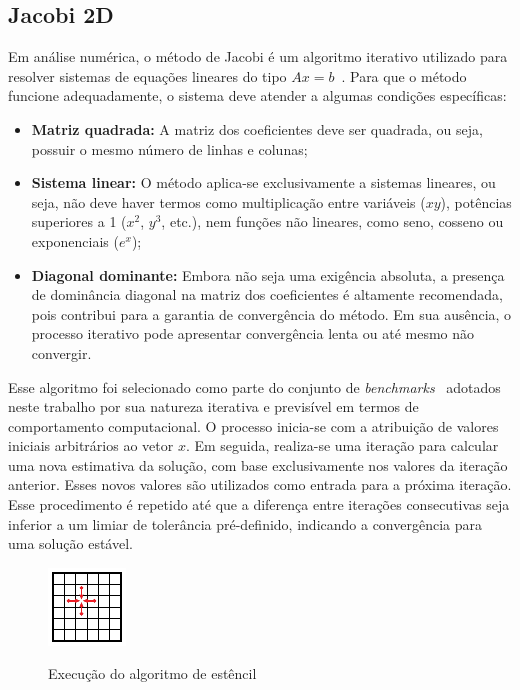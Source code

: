 \subsection{Jacobi 2D}\label{subsec:jacobi2d}

Em análise numérica, o método de Jacobi é um algoritmo iterativo utilizado para resolver sistemas de equações lineares do tipo $Ax = b$~\cite{szep2007}. Para que o método funcione adequadamente, o sistema deve atender a algumas condições específicas:

\begin{itemize}
	\item \textbf{Matriz quadrada:} A matriz dos coeficientes deve ser quadrada, ou seja, possuir o mesmo número de linhas e colunas;
	\item \textbf{Sistema linear:} O método aplica-se exclusivamente a sistemas lineares, ou seja, não deve haver termos como multiplicação entre variáveis ($xy$), potências superiores a 1 ($x^2$, $y^3$, etc.), nem funções não lineares, como seno, cosseno ou exponenciais ($e^x$);
	\item \textbf{Diagonal dominante:} Embora não seja uma exigência absoluta, a presença de dominância diagonal na matriz dos coeficientes é altamente recomendada, pois contribui para a garantia de convergência do método. Em sua ausência, o processo iterativo pode apresentar convergência lenta ou até mesmo não convergir.
\end{itemize}

Esse algoritmo foi selecionado como parte do conjunto de \textit{benchmarks}~\cite{polybench} adotados neste trabalho por sua natureza iterativa e previsível em termos de comportamento computacional. O processo inicia-se com a atribuição de valores iniciais arbitrários ao vetor $x$. Em seguida, realiza-se uma iteração para calcular uma nova estimativa da solução, com base exclusivamente nos valores da iteração anterior. Esses novos valores são utilizados como entrada para a próxima iteração. Esse procedimento é repetido até que a diferença entre iterações consecutivas seja inferior a um limiar de tolerância pré-definido, indicando a convergência para uma solução estável.

\begin{figure}[htb]
	\caption{Execução do algoritmo de estêncil}
	\centering
	\includegraphics[scale=5]{figuras/jacobi2d.pdf}
	\label{fig:jacobi2d}
\end{figure}

